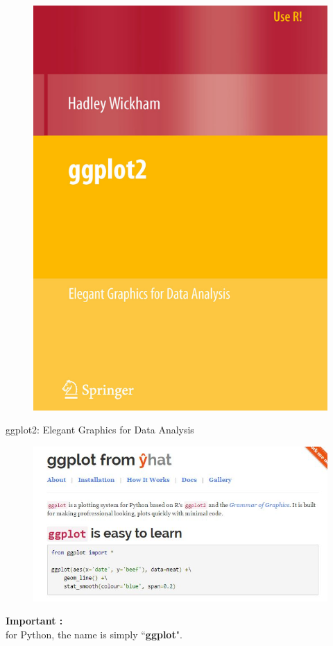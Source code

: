 \documentclass{beamer}
\begin{document}
\begin{frame}
\begin{figure}
\centering
\includegraphics[width=0.55\linewidth]{ggplot2-bookcover}
\end{figure}
ggplot2: Elegant Graphics for Data Analysis
\end{frame}

\begin{frame}
\begin{figure}
\centering
\includegraphics[width=1.1\linewidth]{ggplot-yhat}
\end{figure}
\Large
\noindent \textbf{Important :} \\ for Python, the name is simply ``\textbf{ggplot}".
\end{frame}
\end{document}
